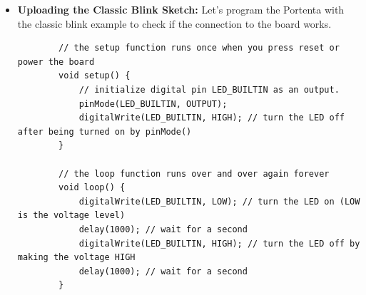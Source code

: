 \begin{itemize}
	\item \textbf{Uploading the Classic Blink Sketch:} Let's program the Portenta with the classic blink example to check if the connection to the board works. 
	
	\begin{lstlisting}
		// the setup function runs once when you press reset or power the board
		void setup() {
			// initialize digital pin LED_BUILTIN as an output.
			pinMode(LED_BUILTIN, OUTPUT);
			digitalWrite(LED_BUILTIN, HIGH); // turn the LED off after being turned on by pinMode()
		}
		
		// the loop function runs over and over again forever
		void loop() {
			digitalWrite(LED_BUILTIN, LOW); // turn the LED on (LOW is the voltage level)
			delay(1000); // wait for a second
			digitalWrite(LED_BUILTIN, HIGH); // turn the LED off by making the voltage HIGH
			delay(1000); // wait for a second
		}   
		
	\end{lstlisting}
	
\end{itemize}

